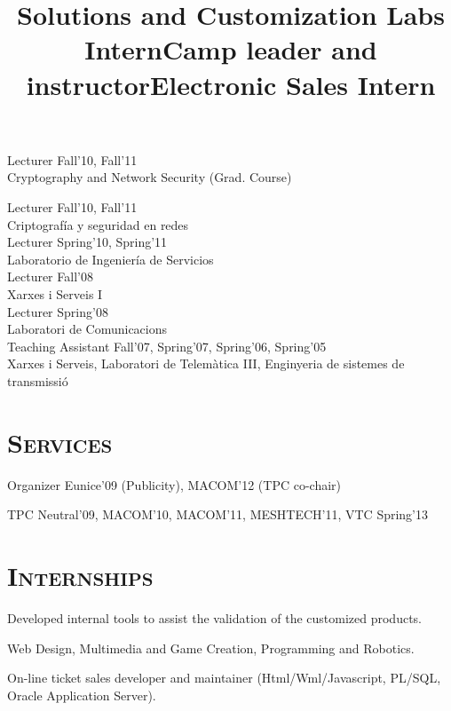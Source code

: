 \documentclass[line,margin]{res}
\begin{document}
\begin{resume}
\begin{samepage}
Lecturer
\hfill {Fall'10, Fall'11}\\
Cryptography and Network Security (Grad. Course) 
\end{samepage}

Lecturer
\hfill {Fall'10, Fall'11}\\
Criptografía y seguridad en redes\\
\newline
Lecturer
\hfill {Spring'10, Spring'11}\\
Laboratorio de Ingeniería de Servicios\\
\newline
Lecturer
\hfill {Fall'08}\\
Xarxes i Serveis I\\
\newline
Lecturer
\hfill {Spring'08}\\
Laboratori de Comunicacions\\
\newline
Teaching Assistant
\hfill {Fall'07, Spring'07, Spring'06, Spring'05}\\
Xarxes i Serveis, Laboratori de Telemàtica III, Enginyeria de sistemes de transmissió

\section{\textsc{Services}}
Organizer
\hfill {Eunice'09 (Publicity), MACOM'12 (TPC co-chair)}

TPC
\hfill {Neutral'09, MACOM'10, MACOM'11, MESHTECH'11, VTC Spring'13}

%

\section{\textsc{Internships}}

\title{Solutions and Customization Labs Intern}
\begin{position}
Developed internal tools to assist the validation of the customized products.
\end{position}

\title{Camp leader and instructor}
\begin{position}
Web Design, Multimedia and Game Creation, Programming and Robotics.
\end{position}

\title{Electronic Sales Intern}
\begin{position}
On-line ticket sales developer and maintainer (Html/Wml/Javascript, PL/SQL, Oracle Application Server).
\end{position}


\end{resume}
\end{document}
